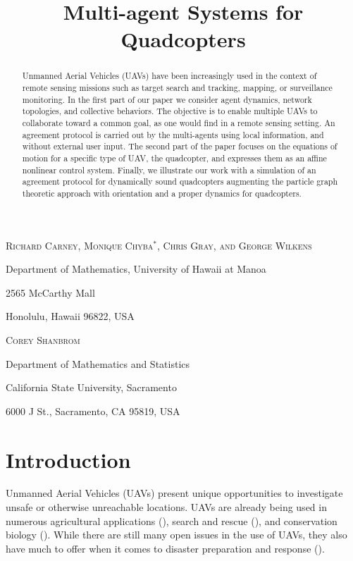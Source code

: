 \documentclass{aims}
\title[Multi-agent Systems for Quadcopters] %
      {Multi-agent Systems for Quadcopters}
\author[Carney, Chyba, Gray, Shanbrom and Wilkens]{}
\theoremstyle{definition}
\begin{document}
\maketitle

\centerline{\scshape Richard Carney, Monique Chyba$^*$, Chris Gray, and George Wilkens }
\medskip
{\footnotesize
 \centerline{Department of Mathematics, University of Hawaii at Manoa}
   \centerline{2565 McCarthy Mall}
   \centerline{Honolulu, Hawaii 96822, USA}
} %



\medskip

\centerline{\scshape Corey Shanbrom}
\medskip
{\footnotesize
 \centerline{Department of Mathematics and Statistics}
   \centerline{California State University, Sacramento}
   \centerline{6000 J St., Sacramento, CA 95819, USA}
}

\bigskip



\begin{abstract}
Unmanned Aerial Vehicles (UAVs) have been increasingly used in the context of remote sensing missions such as target search and tracking, mapping, or surveillance monitoring. In the first part of our paper we consider agent dynamics, network topologies, and collective behaviors. The objective is to enable multiple UAVs to collaborate toward a common goal, as one would find in a remote sensing setting. An agreement protocol is carried out by the multi-agents using local information, and without external user input. The second part of the paper focuses on the equations of motion for a specific type of UAV, the quadcopter, and expresses them as an affine nonlinear control system. Finally, we illustrate our work with a simulation of an  agreement  protocol  for  dynamically  sound  quadcopters augmenting the particle graph theoretic approach with orientation and a proper dynamics for quadcopters. 
\end{abstract}


\section{Introduction}
Unmanned Aerial Vehicles (UAVs) present unique opportunities to investigate unsafe or otherwise unreachable locations. UAVs are already being used in numerous agricultural applications (\cite{Kim,Costa}), search and rescue (\cite{Doherty,Waharte}), and conservation biology (\cite{Wich}).  While there are still many open issues in the use of UAVs, they also have much to offer when it comes to disaster preparation and response (\cite{Erdelj}).
\end{document}
